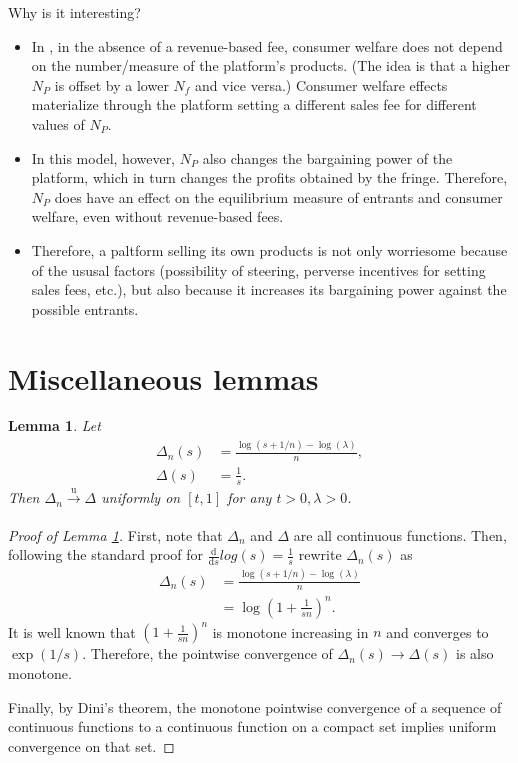 \documentclass[a4paper]{article}
\newtheorem{lemma}{Lemma}
\begin{document}
Why is it interesting?
\begin{itemize}
    \item In \textcite{anderson2021hybrid}, in the absence of a revenue-based fee, consumer welfare does not depend on the number/measure of the platform's products. (The idea is that a higher $N_P$ is offset by a lower $N_f$ and vice versa.) Consumer welfare effects materialize through the platform setting a different sales fee for different values of $N_P$.
    \item In this model, however, $N_P$ also changes the bargaining power of the platform, which in turn changes the profits obtained by the fringe. Therefore, $N_P$ does have an effect on the equilibrium measure of entrants and consumer welfare, even without revenue-based fees.
    \item Therefore, a paltform selling its own products is not only worriesome because of the ususal factors (possibility of steering, perverse incentives for setting sales fees, etc.), but also because it increases its bargaining power against the possible entrants.
\end{itemize}

\appendix

\printbibliography

\section{Miscellaneous lemmas}

\begin{lemma}
    \label{lemma:log_convergence}
    Let 
    \begin{align*}
        \Delta_n(s) &= \frac{\log(s + 1/n) - \log(\lambda)}{n}, \\
        \Delta(s) &= \frac{1}{s}.
    \end{align*}
    Then $\Delta_n \xrightarrow[]{\mathrm{u}} \Delta$ uniformly on $[t, 1]$ for any $t > 0, \lambda > 0$.
\end{lemma}
\begin{proof}[Proof of Lemma \ref{lemma:log_convergence}]
    First, note that $\Delta_n$ and $\Delta$ are all continuous functions. Then, following the standard proof for $\frac{\mathrm{d}}{\mathrm{d}s}log(s) = \frac{1}{s}$ rewrite $\Delta_n(s)$ as
    \begin{align*}
        \Delta_n(s) &= \frac{\log(s + 1/n) - \log(\lambda)}{n} \\
        &= \log \left( 1 + \frac{1}{sn} \right) ^ n .
    \end{align*}
    It is well known that $\left( 1 + \frac{1}{sn} \right) ^ n$ is monotone increasing in $n$ and converges to $\exp (1/s)$. Therefore, the pointwise convergence of $\Delta_n(s) \to \Delta(s)$ is also monotone.

    Finally, by Dini's theorem, the monotone pointwise convergence of a sequence of continuous functions to a continuous function on a compact set implies uniform convergence on that set.
\end{proof}
\end{document}

